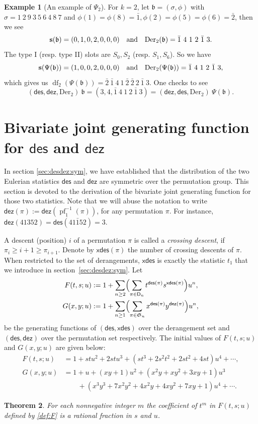 \documentclass[12pt]{amsart} %
\numberwithin{equation}{section}
\theoremstyle{plain}
\newtheorem{theorem}{Theorem}[section]
\theoremstyle{definition}
\newtheorem{example}[theorem]{Example}
\newcommand\D{\mathsf{D}}
\def\dez{\mathsf{dez}}
\def\xdes{\mathsf{xdes}}
\def\Der{\mathrm{Der}}
\def\des{\mathsf{des}}
\def\S{\mathfrak{S}}
\def\b{\mathfrak{b}}
\def\s{\operatorname{{\bf s}}}
\def\df{\operatorname{df}}
\def\pf{\operatorname{pf}}
\def\s{\operatorname{{\bf s}}}
\def\neg#1{{{{\bar#1}}}}
\begin{document}
\begin{example}[An example of $\Psi_2$]
For $k=2$, let $\b=(\sigma,\phi)$ with $\sigma=1~2~9~3~5~6~4~8~7$ and $\phi(1)=\phi(8)=\neg 1,\phi(2)=\phi(5)=\phi(6)=\neg 2$, then we see
$$\s(\b)=(0,1,0,2,0,0,0)\quad\text{and}\quad \Der_2(\b)=\neg 1~4~1~2~\neg 1~3.$$
The type I (resp. type II) slots are $S_0,S_2$ (resp. $S_1,S_6$). So we have
$$\s(\Psi(\b))=(1,0,0,2,0,0,0)\quad\text{and}\quad \Der_2(\Psi(\b))=\neg 1~4~1~2~\neg 1~3,$$
which gives us $\df_2(\Psi(\b))=\neg 2~\neg 1~4~1~\neg 2~\neg 2~2~\neg 1~3$. One checks to see
$$(\des, \dez, \Der_2)~\b = (3, 4, \neg 1~4~1~2~\neg 1~3) = (\dez, \des, \Der_2)~\Psi(\b).$$
\end{example}


\section{Bivariate joint generating function for \texorpdfstring{$\des$ and $\dez$}{des and dez}} %
\label{sec:4}
In section \ref{sec:desdez:sym}, we have established that the distribution of the  two Eulerian statistics $\des$ and $\dez$ are symmetric over the permutation group. This section is devoted to the derivation of the bivariate joint generating function for those two statistics. Note that we will abuse the notation to write $\dez(\pi):=\dez(\pf_1^{-1}(\pi))$, for any permutation $\pi$. For instance, $\dez(41352)=\des(41\neg 152)=3$.

A descent (position) $i$ of a permutation $\pi$ is called a {\em crossing descent}, if $\pi_i\ge i+1\ge \pi_{i+1}$. Denote by $\xdes(\pi)$ the number of crossing descents of $\pi$. When restricted to the set of derangements, $\xdes$ is exactly the statistic $t_1$ that we introduce in section~\ref{sec:desdez:sym}. Let
\begin{align}
	\label{def:F}F(t,s; u)&:=1+\sum_{n\geq 2} \Bigl( \sum_{\pi\in \D_n} 
	 t^{\des(\pi)}  s^{\xdes(\pi)} \Bigr) u^n,\\
	\label{def:G}G(x,y; u)&:=1+\sum_{n\geq 1} \Bigl( \sum_{\pi\in{\S}_n} 
	 x^{\des(\pi)} y^{\dez(\pi)} \Bigr) u^n,
\end{align} 
be the generating functions of $(\des, \xdes)$ over the derangement set and $(\des, \dez)$ over the permutation set respectively. The initial values of $F(t,s;u)$ and $G(x,y;u)$ are given below:
\begin{align*}
	F(t,s;u)&= 1+ stu^2 + 2s t u^3 + ( st^3 +  2s^2t^2 + 2st^2 + 4st) u^4 + \cdots , \\
	G(x,y;u)&= 1+ u +    (xy+1)u^2   + (x^2y + xy^2 + 3xy + 1)u^3   \\
	& \qquad + (x^3y^3 + 7x^2y^2 + 4x^2y + 4xy^2 + 7xy + 1)u^4 + \cdots.
\end{align*}
\begin{theorem}\label{th:rational}
	For each nonnegative integer $m$ the coefficient of $t^m$ in $F(t,s;u)$ defined by \eqref{def:F} is a {\it rational fraction} in $s$ and $u$.
\end{theorem}
\end{document}
